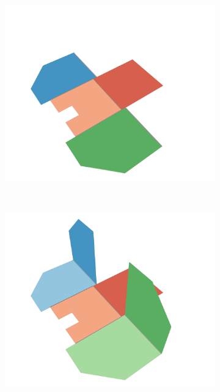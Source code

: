 \begin{figure}[h]
\begin{subfigure}[t]{\subfigureWidth}
		\label{fig:sub:deployment-sequence-ismenius-cavus-mid-bow-and-stern}
	\end{subfigure}\hfill
    \begin{subfigure}[t]{\subfigureWidth}
        \centering
		\includegraphics[height=\graphicsHeight]{sections/design/solar-array/images/deployment/ismenius-cavus/solar_array_deployment_ismenius_cavus_060.png}
		\label{fig:sub:deployment-sequence-ismenius-cavus-full-bow-and-stern}
	\end{subfigure}\\[0.8ex]
	\begin{subfigure}[t]{\subfigureWidth}
        \centering
		\includegraphics[height=\graphicsHeight]{sections/design/solar-array/images/deployment/ismenius-cavus/solar_array_deployment_ismenius_cavus_100.png}

\end{subfigure}
\end{figure}
